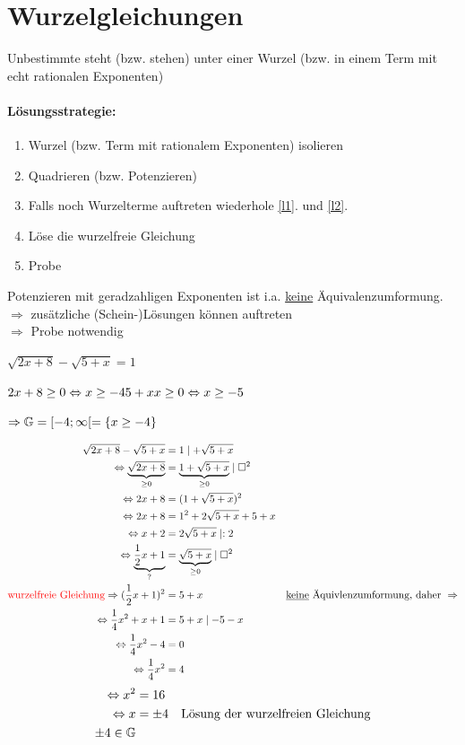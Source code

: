 \section{Wurzelgleichungen}
Unbestimmte steht (bzw. stehen) unter einer Wurzel (bzw. in einem Term mit echt rationalen Exponenten)

\paragraph{Lösungsstrategie:}
\begin{enumerate}
	\item\label{l1} Wurzel (bzw. Term mit rationalem Exponenten) isolieren
	\item\label{l2} Quadrieren (bzw. Potenzieren)
	\item Falls noch Wurzelterme auftreten wiederhole \ref*{l1}. und \ref*{l2}.
	\item Löse die wurzelfreie Gleichung
	\item Probe
\end{enumerate}

\Beachte Potenzieren mit geradzahligen Exponenten ist i.a. \ul{keine} Äquivalenzumformung.\\
$\Rightarrow$ zusätzliche (Schein-)Lösungen können auftreten\\
$\Rightarrow$ Probe notwendig

\clearpage
\Bsp $\sqrt{2x+8} - \sqrt{5+x} = 1$

$2x+8\ge0\Leftrightarrow x\ge -4\\
5+xx\ge0\Leftrightarrow x\ge -5$

$\Rightarrow \mathbb{G}=[-4;\infty[=\{x\ge -4\}$

\begin{align*}
\sqrt{2x+8} - \sqrt{5+x} &= 1\mid+\sqrt{5+x}\\
\Leftrightarrow \underbrace{\sqrt{2x+8}}_{\ge0} &= \underbrace{1 + \sqrt{5+x}}_{\ge0}\mid\square^2\\
\Leftrightarrow 2x+8 &= (1 + \sqrt{5+x})^2\\
\Leftrightarrow 2x+8 &= 1^2 + 2\sqrt{5+x}+5+x\\
\Leftrightarrow x+2 &= 2\sqrt{5+x}\mid:2\\
\Leftrightarrow \underbrace{\frac{1}{2}x+1}_\text{?} &= \underbrace{\sqrt{5+x}}_{\ge0}\mid\square^2\\
\textcolor{red}{\text{wurzelfreie Gleichung}}\Rightarrow (\frac{1}{2}x+1)^2 &= 5+x &\text{\underline{keine} Äquivlenzumformung, daher }\Rightarrow\\
\Leftrightarrow \frac{1}{4}x^2 + x + 1 &= 5+x \mid-5-x\\
\Leftrightarrow \frac{1}{4}x^2 -4 &= 0\\
\Leftrightarrow \frac{1}{4}x^2 &= 4\\
\end{align*}
\begin{align*}
\Leftrightarrow x^2 &= 16\\
\Leftrightarrow x &= \pm4 &\text{Lösung der wurzelfreien Gleichung}\\
\pm4\in\mathbb{G}\\
\end{align*}


